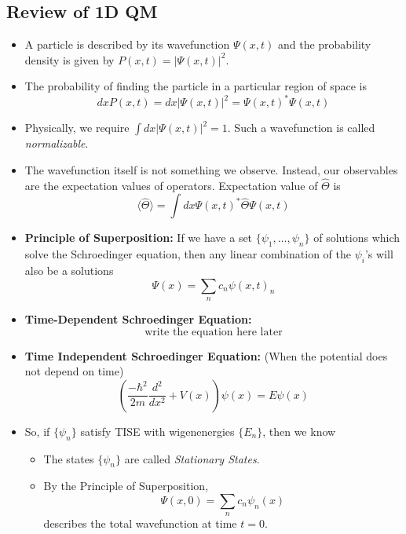 \documentclass{article}
\newcommand{\mean}[1]{\langle #1 \rangle}
\begin{document}
\vskip 0.5cm
\subsection{Review of 1D QM}

\begin{itemize}
  \item A particle is described by its wavefunction $\Psi(x, t)$ and the probability density is given by $P(x, t) = |\Psi(x, t)|^2$. 

  \item The probability of finding the particle in a particular region of space is 
  \[ dx P(x, t) = dx |\Psi(x, t)|^2 = \Psi(x, t)^{*}\Psi(x, t) \]

  \item Physically, we require $\int dx |\Psi(x, t)|^2 = 1$. Such a wavefunction is called \emph{normalizable}.
  
  \item The wavefunction itself is not something we observe. Instead, our observables are the expectation values of operators. Expectation value of $\hat{\Theta}$ is 
  \[ \mean{\hat{\Theta}} = \int dx \Psi(x, t)^{*} \hat{\Theta} \Psi(x, t) \]

  \item \textbf{Principle of Superposition:} If we have a set $\{ \psi_1, \dots, \psi_n \}$ of solutions which solve the Schroedinger equation, then any linear combination of the $\psi_i$'s will also be a solutions
  \[ \Psi(x) = \sum_n c_n \psi(x, t)_n \]

  \item \textbf{Time-Dependent Schroedinger Equation:} 
  \[ \text{write the equation here later} \]

  \item \textbf{Time Independent Schroedinger Equation:} (When the potential does not depend on time)
  \[ \left(\frac{-\hbar^2}{2m} \frac{d^2}{dx^2} + V(x) \right) \psi(x) = E \psi(x) \]

  \item So, if $\{\psi_n\}$ satisfy TISE with wigenenergies $\{E_n\}$, then we know 
      \begin{itemize}
        \item The states $\{\psi_n\}$ are called \emph{Stationary States}.
        
        \item By the Principle of Superposition,
        \[ \Psi(x, 0) = \sum_n c_n \psi_n(x)  \]
        describes the total wavefunction at time $t = 0$.


\end{itemize}
\end{itemize}
\end{document}
